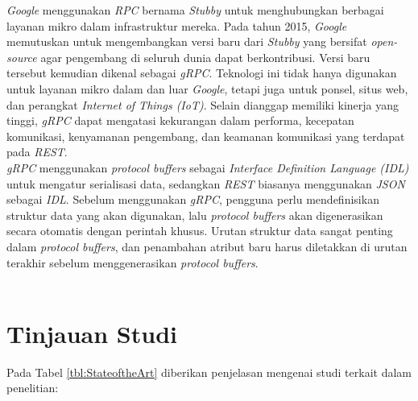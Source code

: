 \textit{Google} menggunakan \textit{RPC} bernama \textit{Stubby} untuk menghubungkan berbagai layanan mikro dalam infrastruktur mereka. Pada tahun 2015, \textit{Google} memutuskan untuk mengembangkan versi baru dari \textit{Stubby} yang bersifat \textit{open-source} agar pengembang di seluruh dunia dapat berkontribusi. Versi baru tersebut kemudian dikenal sebagai \textit{gRPC}. Teknologi ini tidak hanya digunakan untuk layanan mikro dalam dan luar \textit{Google}, tetapi juga untuk ponsel, situs web, dan perangkat \textit{Internet of Things (IoT)}. Selain dianggap memiliki kinerja yang tinggi, \textit{gRPC} dapat mengatasi kekurangan dalam performa, kecepatan komunikasi, kenyamanan pengembang, dan keamanan komunikasi yang terdapat pada \textit{REST}\cite{8}.\\

\textit{gRPC} menggunakan \textit{protocol buffers} sebagai \textit{Interface Definition Language (IDL)} untuk mengatur serialisasi data, sedangkan \textit{REST} biasanya menggunakan \textit{JSON} sebagai \textit{IDL}. Sebelum menggunakan \textit{gRPC}, pengguna perlu mendefinisikan struktur data yang akan digunakan, lalu \textit{protocol buffers} akan digenerasikan secara otomatis dengan perintah khusus. Urutan struktur data sangat penting dalam \textit{protocol buffers}, dan penambahan atribut baru harus diletakkan di urutan terakhir sebelum menggenerasikan \textit{protocol buffers}.
\\\\

\section{Tinjauan Studi}
\par Pada Tabel \ref{tbl:StateoftheArt} diberikan penjelasan mengenai studi terkait dalam penelitian:

